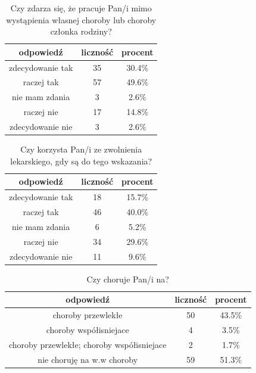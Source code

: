 \documentclass[a4paper,12pt,twoside,openany]{report}
\begin{document}
\begin{table}[h]
\caption{Czy zdarza się, że pracuje Pan/i mimo wystąpienia własnej choroby lub choroby członka rodziny?}
\centering
\begin{tabular}{ | c | c | c |}
\hline
odpowiedź & liczność & procent\\
\hline
zdecydowanie tak  &  35  & 30.4\% \\
\hline
raczej tak  &  57  & 49.6\% \\
\hline
nie mam zdania  &  3  & 2.6\% \\
\hline
raczej nie  &  17  & 14.8\% \\
\hline
zdecydowanie nie  &  3  & 2.6\% \\
\hline
\end{tabular}
\label{tab:Q31}
\end{table}



\begin{table}[h]
\caption{Czy korzysta Pan/i ze zwolnienia lekarskiego, gdy są do tego wskazania?}
\centering
\begin{tabular}{ | c | c | c |}
\hline
odpowiedź & liczność & procent\\
\hline
zdecydowanie tak  &  18  & 15.7\% \\
\hline
raczej tak  &  46  & 40.0\% \\
\hline
nie mam zdania  &  6  & 5.2\% \\
\hline
raczej nie  &  34  & 29.6\% \\
\hline
zdecydowanie nie  &  11  & 9.6\% \\
\hline
\end{tabular}
\label{tab:Q32}
\end{table}



\begin{table}[h]
\caption{Czy choruje Pan/i na?}
\centering
\begin{tabular}{ | c | c | c |}
\hline
odpowiedź & liczność & procent\\
\hline
choroby przewlekłe  &  50  & 43.5\% \\
\hline
choroby współisniejace  &  4  & 3.5\% \\
\hline
choroby przewlekłe; choroby współisniejace  &  2  & 1.7\% \\
\hline
nie choruję na w.w choroby  &  59  & 51.3\% \\
\hline
\end{tabular}
\label{tab:Q33}
\end{table}
\end{document}
